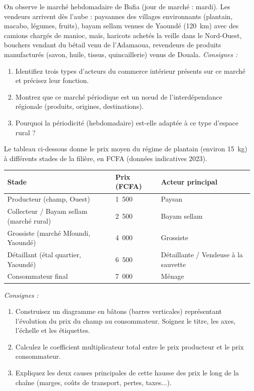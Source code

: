 \documentclass[11pt]{article}
\newcommand{\cle}[1]{{\popxbold\color{popdark}#1}}
\begin{document}
\begin{exercice}
On observe le marché hebdomadaire de Bafia (jour de marché : mardi). Les vendeurs arrivent dès l'aube : paysannes des villages environnants (plantain, macabo, légumes, fruits), \cle{bayam sellam} venues de Yaoundé (120~km) avec des camions chargés de manioc, maïs, haricots achetés la veille dans le Nord-Ouest, bouchers vendant du bétail venu de l'Adamaoua, revendeurs de produits manufacturés (savon, huile, tissus, quincaillerie) venus de Douala.
\emph{Consignes :}
\begin{enumerate}
    \item Identifiez trois types d'acteurs du commerce intérieur présents sur ce marché et précisez leur fonction.
    \item Montrez que ce marché périodique est un nœud de l'interdépendance régionale (produits, origines, destinations).
    \item Pourquoi la périodicité (hebdomadaire) est-elle adaptée à ce type d'espace rural ?
\end{enumerate}
\end{exercice}

\begin{exercice}
Le tableau ci-dessous donne le prix moyen du régime de plantain (environ 15~kg) à différents stades de la filière, en FCFA (données indicatives 2023).
\begin{center}
\begin{tabularx}{\linewidth}{|l|X|X|}\hline
\textbf{Stade} & \textbf{Prix (FCFA)} & \textbf{Acteur principal} \\ \hline
Producteur (champ, Ouest) & 1~500 & Paysan \\ \hline
Collecteur / Bayam sellam (marché rural) & 2~500 & Bayam sellam \\ \hline
Grossiste (marché Mfoundi, Yaoundé) & 4~000 & Grossiste \\ \hline
Détaillant (étal quartier, Yaoundé) & 6~500 & Détaillante / Vendeuse à la sauvette \\ \hline
Consommateur final & 7~000 & Ménage \\ \hline
\end{tabularx}
\end{center}
\emph{Consignes :}
\begin{enumerate}
    \item Construisez un diagramme en bâtons (barres verticales) représentant l'évolution du prix du champ au consommateur. Soignez le titre, les axes, l'échelle et les étiquettes.
    \item Calculez le coefficient multiplicateur total entre le prix producteur et le prix consommateur.
    \item Expliquez les deux causes principales de cette hausse des prix le long de la chaîne (marges, coûts de transport, pertes, taxes...).
\end{enumerate}
\end{exercice}
\end{document}
